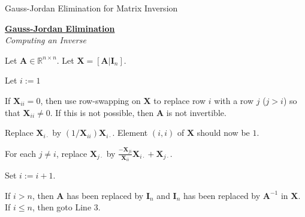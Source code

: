 \begin{algorithm}
\caption{Gauss-Jordan Elimination for Matrix Inversion}
\label{alg:GaussJordanEliminationInv}
\begin{center}
\begin{minipage}[t]{\textwidth-1em}
\underline{\textbf{Gauss-Jordan Elimination}}\\
\textit{Computing an Inverse}
\begin{enumerate*}
\item Let $\mathbf{A} \in \mathbb{R}^{n \times n}$. Let $\mathbf{X} = [\mathbf{A} | \mathbf{I}_n]$.
\item Let $i := 1$
\item If $\mathbf{X}_{ii} = 0$, then use row-swapping on $\mathbf{X}$ to replace row $i$ with a row $j$ ($j > i$) so that $\mathbf{X}_{ii} \neq 0$. If this is not possible, then $\mathbf{A}$ is not invertible.
\item Replace $\mathbf{X}_{i\cdot}$ by $(1/\mathbf{X}_{ii})\mathbf{X}_{i\cdot}$. Element $(i,i)$ of $\mathbf{X}$ should now be $1$.
\item For each $j \neq i$, replace $\mathbf{X}_{j\cdot}$ by $\frac{-\mathbf{X}_{ji}}{\mathbf{X}_{ii}}\mathbf{X}_{i\cdot} + \mathbf{X}_{j\cdot}$.
\item Set $i := i + 1$.
\item If $i > n$, then $\mathbf{A}$ has been replaced by $\mathbf{I}_n$ and $\mathbf{I}_n$ has been replaced by $\mathbf{A}^{-1}$ in $\mathbf{X}$. If $i \leq n$, then goto Line 3.
\end{enumerate*}
\end{minipage}
\end{center}
\end{algorithm}

